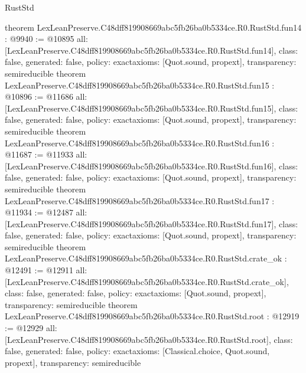 \begin{lexlean}{RustStd}
\begin{coremodule}
{}
theorem LexLeanPreserve.C48dff819908669abc5fb26ba0b5334ce.R0.RustStd.fun14 : @9940 := @10895 {
  all: [LexLeanPreserve.C48dff819908669abc5fb26ba0b5334ce.R0.RustStd.fun14],
  class: false,
  generated: false,
  policy: exact{axioms: [Quot.sound, propext]},
  transparency: semireducible
}
theorem LexLeanPreserve.C48dff819908669abc5fb26ba0b5334ce.R0.RustStd.fun15 : @10896 := @11686 {
  all: [LexLeanPreserve.C48dff819908669abc5fb26ba0b5334ce.R0.RustStd.fun15],
  class: false,
  generated: false,
  policy: exact{axioms: [Quot.sound, propext]},
  transparency: semireducible
}
theorem LexLeanPreserve.C48dff819908669abc5fb26ba0b5334ce.R0.RustStd.fun16 : @11687 := @11933 {
  all: [LexLeanPreserve.C48dff819908669abc5fb26ba0b5334ce.R0.RustStd.fun16],
  class: false,
  generated: false,
  policy: exact{axioms: [Quot.sound, propext]},
  transparency: semireducible
}
theorem LexLeanPreserve.C48dff819908669abc5fb26ba0b5334ce.R0.RustStd.fun17 : @11934 := @12487 {
  all: [LexLeanPreserve.C48dff819908669abc5fb26ba0b5334ce.R0.RustStd.fun17],
  class: false,
  generated: false,
  policy: exact{axioms: [Quot.sound, propext]},
  transparency: semireducible
}
theorem LexLeanPreserve.C48dff819908669abc5fb26ba0b5334ce.R0.RustStd.crate_ok : @12491 := @12911 {
  all: [LexLeanPreserve.C48dff819908669abc5fb26ba0b5334ce.R0.RustStd.crate_ok],
  class: false,
  generated: false,
  policy: exact{axioms: [Quot.sound, propext]},
  transparency: semireducible
}
theorem LexLeanPreserve.C48dff819908669abc5fb26ba0b5334ce.R0.RustStd.root : @12919 := @12929 {
  all: [LexLeanPreserve.C48dff819908669abc5fb26ba0b5334ce.R0.RustStd.root],
  class: false,
  generated: false,
  policy: exact{axioms: [Classical.choice, Quot.sound, propext]},
  transparency: semireducible
}


\end{coremodule}
\end{lexlean}
